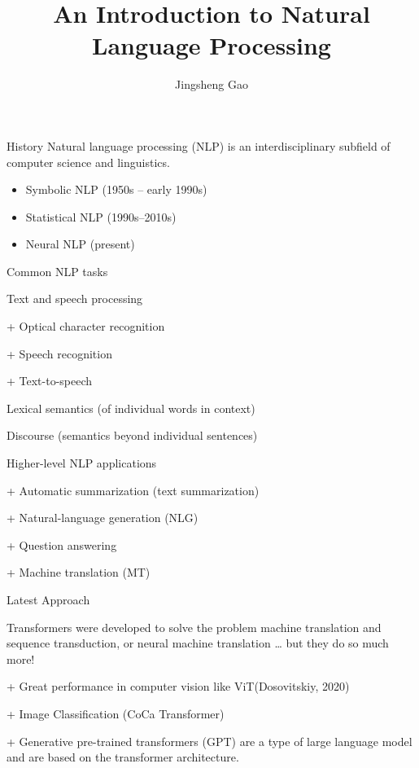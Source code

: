 \documentclass[
  notheorems,
  aspectratio=54,
]{beamer}
\title{An Introduction to Natural Language Processing}
\author{Jingsheng Gao}
\institute{Anqing Normal University}
\begin{document}
\begin{frame}
    \titlepage
\end{frame}

\newcommand{\subitem}[1]{
    {\fontsize{10}{12}\selectfont\setlength\itemindent{12pt} \item[+] #1}
}

\newcommand{\subsubitem}[1]{
    {\fontsize{10}{12}\selectfont\setlength\itemindent{40pt} \item[-] #1}
}

\begin{frame}{History}
  Natural language processing (NLP) is an interdisciplinary subfield of computer science and linguistics.
  \begin{itemize}
    \item Symbolic NLP (1950s – early 1990s)
    \item Statistical NLP (1990s–2010s)
    \item Neural NLP (present)
  \end{itemize}
\end{frame}

\begin{frame}{Common NLP tasks}
  \begin{itemize}
    \item Text and speech processing
      \subitem {Optical character recognition}
      \subitem {Speech recognition}
      \subitem {Text-to-speech}
    \item Lexical semantics (of individual words in context)
    \item Discourse (semantics beyond individual sentences)
    \item Higher-level NLP applications
      \subitem {Automatic summarization (text summarization)}
      \subitem {Natural-language generation (NLG)}
      \subitem {Question answering}
      \subitem {Machine translation (MT)}
  \end{itemize}
\end{frame}

\begin{frame}{Latest Approach}
 \begin{itemize}
    \item
      Transformers were developed to solve the problem machine translation and sequence transduction, or neural machine translation … but they do so much more!
      \subitem{Great performance in computer vision like ViT(Dosovitskiy, 2020)}
      \subitem{Image Classification (CoCa Transformer)}
      \subitem{Generative pre-trained transformers (GPT) are a type of large language model and are based on the transformer architecture.}
  \end{itemize}
\end{frame}
\end{document}
